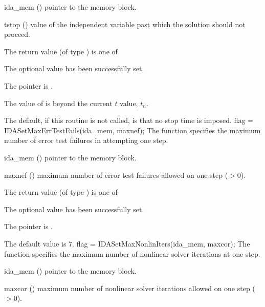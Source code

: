 {{}
{
  \begin{args}
  \item[ida\_mem] ()
    pointer to the {\ida} memory block.
  \item[tstop] ()
    value of the independent variable past which the solution should
    not proceed.
  \end{args}
}
{
  The return value  (of type ) is one of
  \begin{args}
  \item[\Id{IDA\_SUCCESS}] 
    The optional value has been successfully set.
  \item[\Id{IDA\_MEM\_NULL}] 
    The  pointer is .
  \item[\Id{IDA\_ILL\_INPUT}] 
    The value of  is beyond the current $t$ value, $t_n$.
  \end{args}
}
{
  The default, if this routine is not called, is that no stop time is imposed.
}
{
flag = IDASetMaxErrTestFails(ida\_mem, maxnef);
}
{
  The function  specifies the
  maximum number of error test failures in attempting one step.
}
{
  \begin{args}
  \item[ida\_mem] ()
    pointer to the {\ida} memory block.
  \item[maxnef] ()
    maximum number of error test failures allowed on one step ($>0$).
  \end{args}
}
{
  The return value  (of type ) is one of
  \begin{args}
  \item[\Id{IDA\_SUCCESS}] 
    The optional value has been successfully set.
  \item[\Id{IDA\_MEM\_NULL}]
    The  pointer is .
  \end{args}
}
{
  The default value is $7$.
}
{
flag = IDASetMaxNonlinIters(ida\_mem, maxcor);
}
{
  The function  specifies the maximum
  number of nonlinear solver iterations at one step.
}
{
  \begin{args}
  \item[ida\_mem] ()
    pointer to the {\ida} memory block.
  \item[maxcor] ()
    maximum number of nonlinear solver iterations allowed on one step ($>0$).

\end{args}}}
